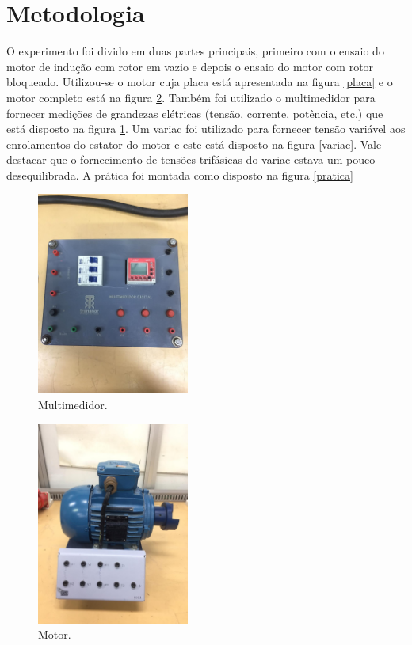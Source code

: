 \section{Metodologia}

O experimento foi divido em duas partes principais, primeiro com o ensaio do motor de indução com rotor em vazio e depois o ensaio do motor com rotor bloqueado. Utilizou-se o motor cuja placa está apresentada na figura \ref{placa} e o motor completo está na figura \ref{motor}. Também foi utilizado o multimedidor para fornecer medições de grandezas elétricas (tensão, corrente, potência, etc.) que está disposto na figura \ref{multimedidor}. Um variac foi utilizado para fornecer tensão variável aos enrolamentos do estator do motor e este está disposto na figura \ref{variac}. Vale destacar que o fornecimento de tensões trifásicas do variac estava um pouco desequilibrada. A prática foi montada como disposto na figura \ref{pratica}



\begin{figure}[h!]
\centering
    \includegraphics[width=5cm]{images/mult.jpeg}  
\caption{Multimedidor.}
\label{multimedidor} 
\end{figure}

\begin{figure}[h!]
\centering
    \includegraphics[width=5cm]{images/motor.jpeg}  
\caption{Motor.}
\label{motor} 
\end{figure}

